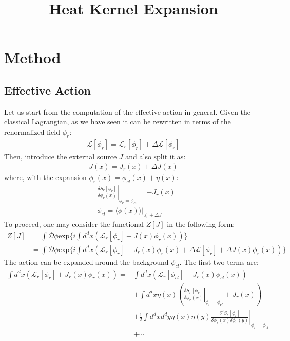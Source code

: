 \documentclass[fleqn]{article}
\title{Heat Kernel Expansion}
\begin{document}
\maketitle
\section{Method}
\subsection{Effective Action}
Let us start from the computation of the effective action in general. Given the classical Lagrangian, as we have seen it can be rewritten in terms of the renormalized field $\phi _r$:
\begin{align}
\mathcal{L} [\phi_r] = \mathcal{L}_r[\phi_r] + \Delta \mathcal{L}[\phi_r]
\end{align}
Then, introduce the external source $J$ and also split it as:
\begin{align}
J(x) = J_r(x) + \Delta J(x)
\end{align}
where, with the expansion $\phi_r(x) = \phi_{cl} (x) + \eta (x)$:
\begin{align}
&\left. \frac{\delta S_r [\phi _r]}{\delta \phi _r (x)} \right| _{\phi_r = \phi_{cl}} = -J_r(x) \\
&\phi_{cl} = \left. \langle \phi(x) \rangle \right|_{J_r + \Delta J}
\end{align}
To proceed, one may consider the functional $Z[J]$ in the following form:
\begin{align}
Z[J] &= \int \mathcal{D}\phi \text{exp}\lbrace i\int d^{d}x (\mathcal{L}_{r} [\phi_r] + J(x) \phi_{r}(x)) \rbrace \nonumber \\
&= \int \mathcal{D} \phi \text{exp} \lbrace i\int d^{d}x (\mathcal{L}_r[\phi_r]  + J_{r}(x)\phi_{r}(x) + \Delta \mathcal{L}[\phi_r] + \Delta J(x) \phi_{r}(x)) \rbrace
\end{align}
The action can be expanded around the background $\phi_{cl}$. The first two terms are:
\begin{align}
\int d^{d}x (\mathcal{L}_r[\phi_r]  + J_{r}(x)\phi_{r}(x))  = &\int d^{d}x (\mathcal{L}_r[\phi_{cl}]  + J_{r}(x)\phi_{cl}(x)) \nonumber \\
&+ \int d^{d}x \eta(x) (\left.\frac{\delta S_{r}[\phi_{r}]}{\delta \phi_{r}(x)} \right|_{\phi_{r} = \phi_{cl}} + J_{r}(x) ) \nonumber  \\
& + \frac{1}{2} \int d^{d}x d^{d}y \eta (x)\eta (y) \left. \frac{\delta^{2} S_{r}[\phi_{r}]}{\delta \phi_{r}(x) \delta \phi_{r} (y)} \right|_{\phi_{r} = \phi_{cl}} \nonumber \\
&+ \cdots
\end{align}
\end{document}
